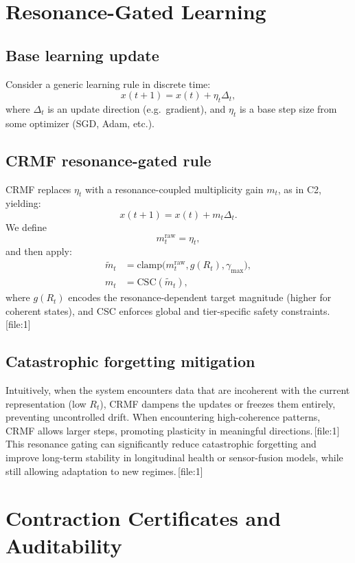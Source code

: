 \documentclass[11pt]{article}
\begin{document}
\section{Resonance-Gated Learning}

\subsection{Base learning update}

Consider a generic learning rule in discrete time:
\[
  x(t+1) = x(t) + \eta_t \Delta_t,
\]
where $\Delta_t$ is an update direction (e.g.\ gradient), and $\eta_t$ is a base step size from some optimizer (SGD, Adam, etc.).

\subsection{CRMF resonance-gated rule}

CRMF replaces $\eta_t$ with a resonance-coupled multiplicity gain $m_t$, as in C2, yielding:
\[
  x(t+1) = x(t) + m_t \Delta_t.
\]
We define
\[
  m^{\mathrm{raw}}_t = \eta_t,
\]
and then apply:
\begin{align*}
  \tilde{m}_t &= \mathrm{clamp}\bigl(m^{\mathrm{raw}}_t, g(R_t), \gamma_{\max}\bigr), \\
  m_t &= \mathrm{CSC}(\tilde{m}_t),
\end{align*}
where $g(R_t)$ encodes the resonance-dependent target magnitude (higher for coherent states), and CSC enforces global and tier-specific safety constraints.\,[file:1]

\subsection{Catastrophic forgetting mitigation}

Intuitively, when the system encounters data that are incoherent with the current representation (low $R_t$), CRMF dampens the updates or freezes them entirely, preventing uncontrolled drift.
When encountering high-coherence patterns, CRMF allows larger steps, promoting plasticity in meaningful directions.\,[file:1]
This resonance gating can significantly reduce catastrophic forgetting and improve long-term stability in longitudinal health or sensor-fusion models, while still allowing adaptation to new regimes.\,[file:1]

\section{Contraction Certificates and Auditability}
\end{document}
